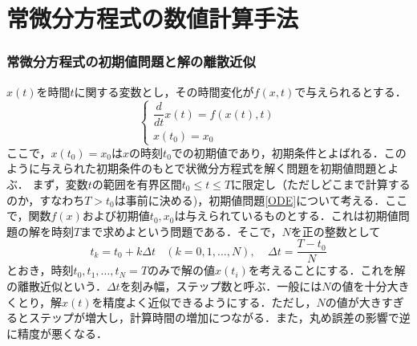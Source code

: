 \part{常微分方程式の数値計算手法}

\section{常微分方程式の初期値問題と解の離散近似}
$x(t)$を時間$t$に関する変数とし，その時間変化が$f(x,t)$で与えられるとする．
\begin{equation}\label{ODE}
	\left\{
\begin{array}{l}
\dfrac{d}{dt}x(t)=f(x(t),t) \\[10pt]
x(t_0)=x_0
\end{array}
\right.
\end{equation}
ここで，$x(t_0)=x_0$は$x$の時刻$t_0$での初期値であり，初期条件とよばれる．このように与えられた初期条件のもとで状微分方程式を解く問題を初期値問題とよぶ．
まず，変数$t$の範囲を有界区間$t_0\leq t\leq T$に限定し（ただしどこまで計算するのか，すなわち$T>t_0$は事前に決める)，初期値問題\eqref{ODE}について考える．ここで，関数$f(x)$および初期値$t_0,x_0$は与えられているものとする．これは初期値問題の解を時刻$T$まで求めよという問題である．そこで，$N$を正の整数として
\begin{equation}
	t_k=t_0 + k \Delta t\ \ \ \ (k=0,1,\ldots,N),\ \ \ \ \ \Delta t=\frac{T-t_0}{N}
\end{equation}
とおき，時刻$t_0,t_1,\ldots,t_N=T$のみで解の値$x(t_i)$を考えることにする．これを解の離散近似という．$\Delta t$を刻み幅，ステップ数と呼ぶ．一般には$N$の値を十分大きくとり，解$x(t)$を精度よく近似できるようにする．ただし，$N$の値が大きすぎるとステップが増大し，計算時間の増加につながる．また，丸め誤差の影響で逆に精度が悪くなる．
%
